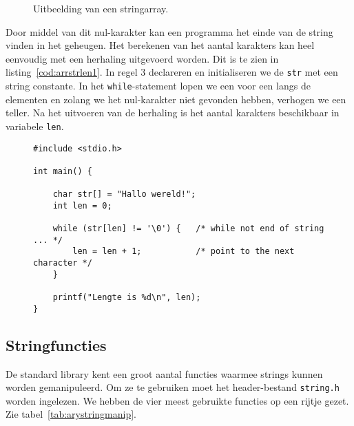 \begin{figure}[H]
\centering
{}
\caption{Uitbeelding van een stringarray.}
\label{fig:arrastring}
\end{figure}

Door middel van dit nul-karakter kan een programma het einde van de string vinden in het geheugen. Het berekenen van het aantal karakters kan heel eenvoudig met een herhaling uitgevoerd worden. Dit is te zien in listing~\ref{cod:arrstrlen1}. In regel 3 declareren en initialiseren we de \texttt{str} met een string constante. In het \texttt{while}-statement lopen we een voor een langs de elementen en zolang we het nul-karakter niet gevonden hebben, verhogen we een teller. Na het uitvoeren van de herhaling is het aantal karakters beschikbaar in variabele \texttt{len}.

\begin{figure}[!ht]
\begin{lstlisting}[caption=Berekenen van de lengte van een string.,label=cod:arrstrlen1]
#include <stdio.h>

int main() {

    char str[] = "Hallo wereld!";
    int len = 0;

    while (str[len] != '\0') {   /* while not end of string ... */
        len = len + 1;           /* point to the next character */
    }

    printf("Lengte is %d\n", len);
}
\end{lstlisting}
\end{figure}

\subsection{Stringfuncties}
De standard library kent een groot aantal functies waarmee strings kunnen worden gemanipuleerd. Om ze te gebruiken moet het header-bestand \texttt{string.h} worden ingelezen. We hebben de vier meest gebruikte functies op een rijtje gezet. Zie tabel~\ref{tab:arystringmanip}.

